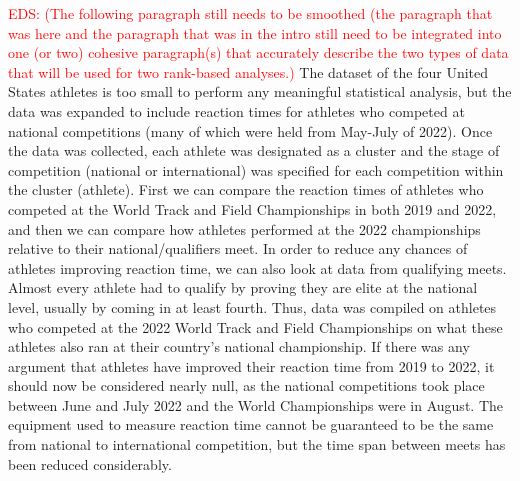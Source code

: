 \documentclass[12pt, letterpaper, titlepage]{article}
\newcommand{\eds}[1]{\textcolor{red}{EDS: (#1)}}
\begin{document}
\eds{The following paragraph still needs to be smoothed (the paragraph that was 
here and the paragraph that was in the intro still need to be integrated into 
one (or two) cohesive paragraph(s) that accurately describe the two types of 
data that will be used for two rank-based analyses.}
The dataset of the four United States athletes 
is too small to perform any meaningful statistical analysis, but
the data was expanded to include reaction times for athletes who competed at 
national competitions (many of which were held from May-July of 2022). Once the 
data was collected, each athlete was designated as a cluster and the stage of
competition (national or international) was specified for each competition 
within the cluster (athlete). First we can compare the reaction times of 
athletes who
competed at the World Track and Field Championships in both 2019 and 2022, and 
then we can compare how athletes performed at the 2022 championships relative 
to their national/qualifiers meet. In order to reduce any chances
of athletes improving reaction time, we can also look at data from qualifying 
meets. Almost every athlete had to qualify by proving they are elite at the 
national level, usually by coming in at least fourth. Thus, data was compiled on 
athletes who competed at the 2022 World Track and Field Championships on what 
these athletes also ran at their country's national championship. If there was 
any argument that athletes
have improved their reaction time from 2019 to 2022, it should now be considered
nearly null, as the national competitions took place between June and July 2022 
and the World Championships were in August. The equipment used to measure 
reaction time cannot be guaranteed to be the same from national to international
competition, but the time span between meets has been reduced considerably. 
\end{document}
